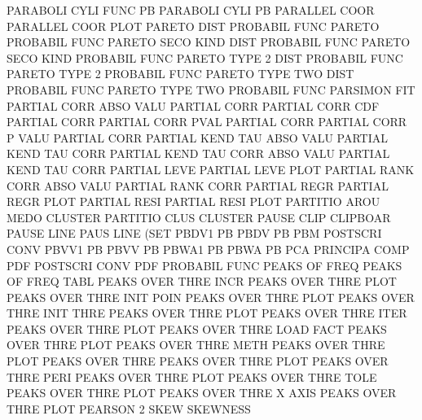 PARABOLI CYLI FUNC                      PB
PARABOLI CYLI                           PB
PARALLEL COOR                           PARALLEL COOR PLOT
PARETO   DIST                           PROBABIL FUNC
PARETO                                  PROBABIL FUNC
PARETO   SECO KIND DIST                 PROBABIL FUNC
PARETO   SECO KIND                      PROBABIL FUNC
PARETO   TYPE 2    DIST                 PROBABIL FUNC
PARETO   TYPE 2                         PROBABIL FUNC
PARETO   TYPE TWO  DIST                 PROBABIL FUNC
PARETO   TYPE TWO                       PROBABIL FUNC
PARSIMON                                FIT
PARTIAL  CORR ABSO VALU                 PARTIAL  CORR
PARTIAL  CORR CDF                       PARTIAL  CORR
PARTIAL  CORR PVAL                      PARTIAL  CORR
PARTIAL  CORR P    VALU                 PARTIAL  CORR
PARTIAL  KEND TAU  ABSO VALU            PARTIAL  KEND TAU  CORR
PARTIAL  KEND TAU  CORR ABSO VALU       PARTIAL  KEND TAU  CORR
PARTIAL  LEVE                           PARTIAL  LEVE PLOT
PARTIAL  RANK CORR ABSO VALU            PARTIAL  RANK CORR
PARTIAL  REGR                           PARTIAL  REGR PLOT
PARTIAL  RESI                           PARTIAL  RESI PLOT
PARTITIO AROU MEDO                      CLUSTER
PARTITIO CLUS                           CLUSTER
PAUSE    CLIP                           CLIPBOAR
PAUSE    LINE                           PAUS     LINE (SET
PBDV1                                   PB
PBDV                                    PB
PBM                                     POSTSCRI CONV
PBVV1                                   PB
PBVV                                    PB
PBWA1                                   PB
PBWA                                    PB
PCA                                     PRINCIPA COMP
PDF                                     POSTSCRI CONV
PDF                                     PROBABIL FUNC
PEAKS    OF   FREQ                      PEAKS    OF   FREQ TABL
PEAKS    OVER THRE INCR                 PEAKS    OVER THRE PLOT
PEAKS    OVER THRE INIT POIN            PEAKS    OVER THRE PLOT
PEAKS    OVER THRE INIT THRE            PEAKS    OVER THRE PLOT
PEAKS    OVER THRE ITER                 PEAKS    OVER THRE PLOT
PEAKS    OVER THRE LOAD FACT            PEAKS    OVER THRE PLOT
PEAKS    OVER THRE METH                 PEAKS    OVER THRE PLOT
PEAKS    OVER THRE                      PEAKS    OVER THRE PLOT
PEAKS    OVER THRE PERI                 PEAKS    OVER THRE PLOT
PEAKS    OVER THRE TOLE                 PEAKS    OVER THRE PLOT
PEAKS    OVER THRE X    AXIS            PEAKS    OVER THRE PLOT
PEARSON  2    SKEW                      SKEWNESS
